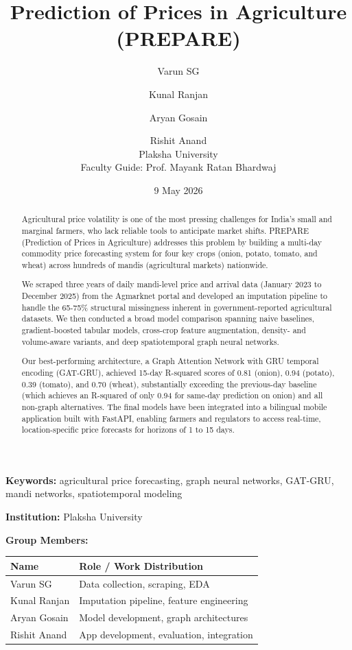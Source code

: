 \documentclass[12pt]{article}
\title{Prediction of Prices in Agriculture (PREPARE)}
\author{
Varun SG \and Kunal Ranjan \and Aryan Gosain \and Rishit Anand\\[0.5em]
Plaksha University\\
Faculty Guide: Prof. Mayank Ratan Bhardwaj
}
\date{9 May 2026}
\begin{document}
\maketitle

\begin{abstract}

Agricultural price volatility is one of the most pressing challenges for India's small and marginal farmers, who lack reliable tools to anticipate market shifts. PREPARE (Prediction of Prices in Agriculture) addresses this problem by building a multi-day commodity price forecasting system for four key crops (onion, potato, tomato, and wheat) across hundreds of mandis (agricultural markets) nationwide.

We scraped three years of daily mandi-level price and arrival data (January 2023 to December 2025) from the Agmarknet portal and developed an imputation pipeline to handle the 65-75\% structural missingness inherent in government-reported agricultural datasets. We then conducted a broad model comparison spanning naive baselines, gradient-boosted tabular models, cross-crop feature augmentation, density- and volume-aware variants, and deep spatiotemporal graph neural networks.

Our best-performing architecture, a Graph Attention Network with GRU temporal encoding (GAT-GRU), achieved 15-day R-squared scores of 0.81 (onion), 0.94 (potato), 0.39 (tomato), and 0.70 (wheat), substantially exceeding the previous-day baseline (which achieves an R-squared of only 0.94 for same-day prediction on onion) and all non-graph alternatives. The final models have been integrated into a bilingual mobile application built with FastAPI, enabling farmers and regulators to access real-time, location-specific price forecasts for horizons of 1 to 15 days.

\end{abstract}

\noindent\textbf{Keywords:} agricultural price forecasting, graph neural networks, GAT-GRU, mandi networks, spatiotemporal modeling

\textbf{Institution:} Plaksha University

\textbf{Group Members:}

\begin{table}[H]
\centering
\begin{tabularx}{\textwidth}{|>{\raggedright\arraybackslash}X|>{\raggedright\arraybackslash}X|}
\hline
Name & Role / Work Distribution \\
\hline
Varun SG & Data collection, scraping, EDA \\
\hline
Kunal Ranjan & Imputation pipeline, feature engineering \\
\hline
Aryan Gosain & Model development, graph architectures \\
\hline
Rishit Anand & App development, evaluation, integration \\
\hline
\end{tabularx}
\end{table}
\end{document}
